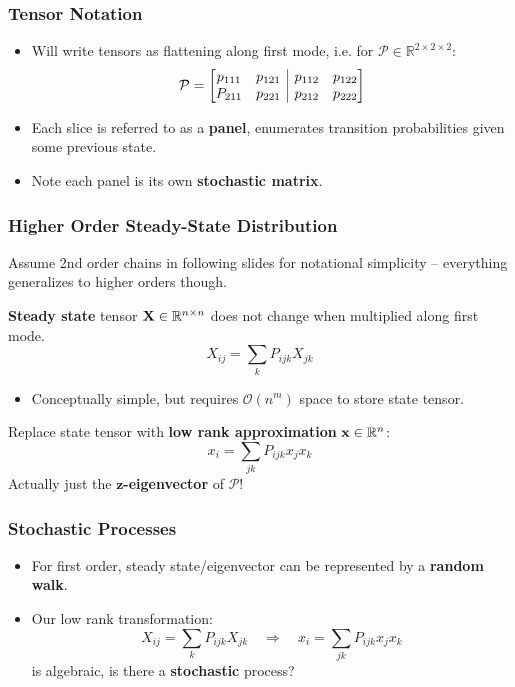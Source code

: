 \documentclass{beamer}
\begin{document}
\begin{frame}
\frametitle{Tensor Notation}
\begin{itemize}

\item Will write tensors as flattening along first mode, i.e. for $\mathcal{P} \in \mathbb{R}^{2 \times 2 \times 2}$:
	\[ \mathcal{P} = \left[
      \begin{array}{@{}cc|cc@{}}
        p_{111} & p_{121} & p_{112} & p_{122} \\
        P_{211} & p_{221} & p_{212} & p_{222}
      \end{array}
    \right]
 \]
\item Each slice is referred to as a \textbf{panel}, enumerates transition probabilities given some previous state.

\item Note each panel is its own \textbf{stochastic matrix}.
\end{itemize}
\end{frame}

\begin{frame}
\frametitle{Higher Order Steady-State Distribution}

Assume 2nd order chains in following slides for notational simplicity -- everything generalizes to higher orders though.

\begin{block}{}
\textbf{Steady state} tensor ${\bf X} \in \mathbb{R}^{n \times n}$ does not change when multiplied along first mode.
\[ X_{ij} = \sum_k P_{ijk} X_{jk} \]
\end{block}
\begin{itemize}
\item Conceptually simple, but requires $\mathcal{O}\left(n^m\right)$ space to store state tensor.
\end{itemize}
\begin{block}{}
Replace state tensor with \textbf{low rank approximation} ${\bf x} \in \mathbb{R}^n$:
\[ x_i = \sum_{jk} P_{ijk} x_j x_k \]
Actually just the \textbf{$\boldsymbol{z}$-eigenvector} of $\mathcal{P}$!
\end{block}

\end{frame}

\begin{frame}
\frametitle{Stochastic Processes}

\begin{itemize}
\item For first order, steady state/eigenvector can be represented by a {\bf random walk}.
\item Our low rank transformation:
\[ X_{ij} = \sum_k P_{ijk} X_{jk} \quad \Rightarrow \quad x_i = \sum_{jk} P_{ijk} x_j x_k \]
is algebraic, is there a {\bf stochastic} process?
\end{itemize}

\end{frame}
\end{document}
